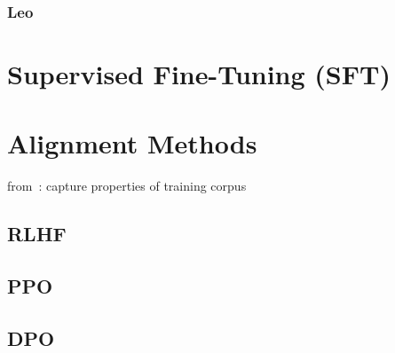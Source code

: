 \subsubsection{Leo}


\section{Supervised Fine-Tuning (SFT)}\label{sec:supervised-fine-tuning}


\section{Alignment Methods}\label{sec:alignment-methods}
from~\autocite{zhao2023survey}:
capture properties of training corpus

\subsection{RLHF}\label{subsec:rlhf}

\subsection{PPO}\label{subsec:ppo}

\subsection{DPO}\label{subsec:dpo}
